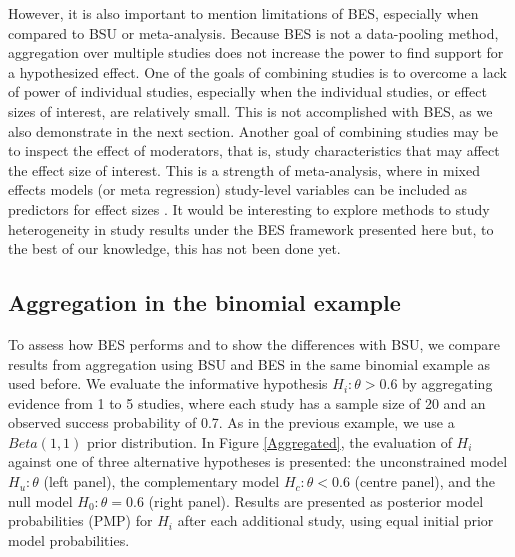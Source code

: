 \documentclass[11pt,reqno]{article}
\begin{document}
However, it is also important to mention limitations of BES, especially when compared to BSU or meta-analysis. Because BES is not a data-pooling method, aggregation over multiple studies does not increase the power to find support for a hypothesized effect. One of the goals of combining studies is to overcome a lack of power of individual studies, especially when the individual studies, or effect sizes of interest, are relatively small. This is not accomplished with BES, as we also demonstrate in the next section. Another goal of combining studies may be to inspect the effect of moderators, that is, study characteristics that may affect the effect size of interest. This is a strength of meta-analysis, where in mixed effects models (or meta regression) study-level variables can be included as predictors for effect sizes \citep[e.g.][]{Borenstein2009}. It would be interesting to explore methods to study heterogeneity in study results under the BES framework presented here but, to the best of our knowledge, this has not been done yet.




\subsection{Aggregation in the binomial example}\label{Binmultiple}

To assess how BES performs and to show the differences with BSU, we compare results from aggregation using BSU and BES in the same binomial example as used before.
We evaluate the informative hypothesis $H_i: \theta>0.6$ by aggregating evidence from 1 to 5 studies, where each study has a sample size of 20 and an observed success probability of 0.7. As in the previous example, we use a $Beta(1,1)$ prior distribution. In Figure \ref{Aggregated}, the evaluation of $H_i$ against one of three alternative hypotheses is presented: the unconstrained model $H_u: \theta$ (left panel), the complementary model $H_c: \theta<0.6$ (centre panel), and the null model $H_0: \theta=0.6$ (right panel). Results are presented as posterior model probabilities (PMP) for $H_i$ after each additional study, using equal initial prior model probabilities.
\end{document}

